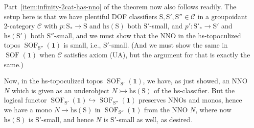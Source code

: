 \documentclass{amsart}
\newcommand\cC{\mathcal{C}}
\newcommand\hs{\mathrm{hs}}
\newcommand\hto{\hookrightarrow}
\newcommand\rS{\mathrm{S}}
\newcommand\SOF{\operatorname{SOF}}
\newcommand\tm{\mathbf{1}}
\newcommand\tto{\rightarrowtail}
\theoremstyle{definition}
\theoremstyle{remark}
\theoremstyle{plainwithref}
\begin{document}
Part~\ref{item:infinity-2cat-has-nno} of the theorem now also follows readily.
The setup here is that we have plentiful DOF classifiers \( \rS, \rS', \rS'' \in \cC \) in a groupoidant 2-category \( \cC \) with \( p \colon \rS_* \to \rS \) and \( \hs(\rS) \) both \( \rS' \)-small, and \( p' \colon \rS'_* \to \rS' \) and \( \hs(\rS') \) both \( \rS'' \)-small, and we must show that the NNO in the hs-topoculized topos \( \SOF_{\rS''}(\tm) \) is small, i.e., \( \rS' \)-small.
(And we must show the same in \( \SOF(\tm) \) when \( \cC \) satisfies axiom (UA), but the argument for that is exactly the same.)

Now, in the hs-topoculized topos \( \SOF_{\rS'}(\tm) \), we have, as just showed, an NNO \( N \) which is given as an underobject \( N \tto \hs(\rS) \) of the hs-classifier.
But the logical functor \( \SOF_{\rS'}(\tm) \hto \SOF_{\rS''}(\tm) \) preserves NNOs and monos, hence we have a mono \( N \to \hs(\rS) \) in \( \SOF_{\rS''}(\tm) \) from the NNO \( N \), where now \( \hs(\rS) \) is \( \rS' \)-small, and hence \( N \) is \( \rS' \)-small as well, as desired.

\printbibliography
\end{document}

